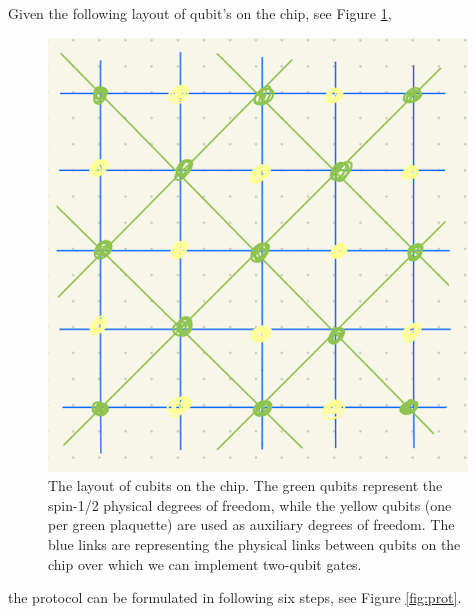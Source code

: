 \documentclass[a4paper,twocolumn,11pt]{quantumarticle}
\begin{document}
Given the following layout of qubit's on the chip, see Figure \ref{fig:chip},
\begin{figure}
\centering
\includegraphics[width=\linewidth]{Figures/on_chip.png}
\caption{The layout of cubits on the chip. The green qubits represent the spin-1/2 physical degrees of freedom, while the yellow qubits (one per green plaquette) are used as auxiliary degrees of freedom. The blue links are representing the physical links between qubits on the chip over which we can implement two-qubit gates.}
\label{fig:chip}
\end{figure}
the protocol can be formulated in following six steps, see Figure \ref{fig:prot}.
\end{document}
